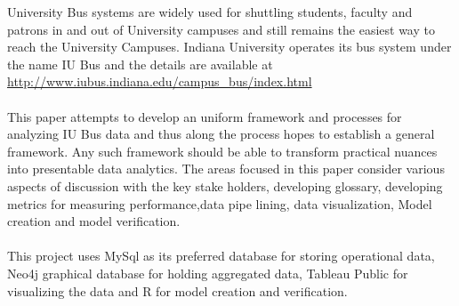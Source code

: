 \documentclass[12pt]{article}
\renewenvironment{abstract}
 {\small
  \begin{center}
  \bfseries \abstractname\vspace{-.5em}\vspace{0pt}
  \end{center}
  \list{}{
    \setlength{\leftmargin}{.5cm}%
    \setlength{\rightmargin}{\leftmargin}%
  }%
  \item\relax}
 {\endlist}
\begin{document}
\begin{abstract}
University Bus systems are widely used for shuttling students, faculty and patrons in and out of University campuses and still remains the easiest way to reach the University Campuses. Indiana University operates its bus system under the name IU Bus and the details are available at \url{http://www.iubus.indiana.edu/campus_bus/index.html} \\ \\
This paper attempts to develop an uniform framework and processes for analyzing IU Bus data and thus along the process hopes to establish a general framework. Any such framework should be able to transform practical nuances into presentable data analytics. The areas focused in this paper consider various aspects of discussion with the key stake holders, developing glossary, developing metrics for measuring performance,data pipe lining, data visualization, Model creation and model verification.\\ \\
This project uses MySql as its preferred database for storing operational data, Neo4j graphical database for holding aggregated data, Tableau Public for visualizing the data and R for model creation and verification.
\end{abstract}

\clearpage

\tableofcontents
\clearpage
\end{document}
